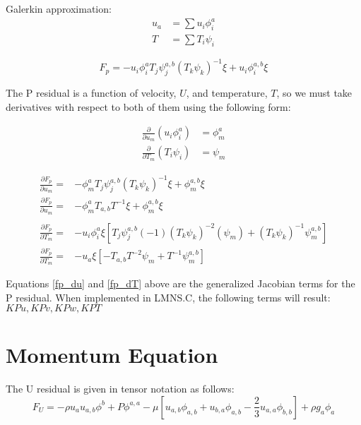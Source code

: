 Galerkin approximation:
\begin{align*}
    u_a &= \sum u_i \phi_i^a\\
    T &= \sum T_i \psi_i
\end{align*}

\begin{equation}
    F_p = -u_i \phi_i^a T_j \psi_j^{a,b} (T_k \psi_k)^{-1} \xi + u_i \phi_i^{a,b} \xi
\end{equation}

The P residual is a function of velocity, $U$, and temperature, $T$, so we must take derivatives with respect to both of them using the following form:

\begin{align*}
    \frac{\partial}{\partial u_m} (u_i \phi_i^a) &= \phi_m^a \\
    \frac{\partial}{\partial T_m} (T_i \psi_i) &= \psi_m
\end{align*}

\begin{align}
    \frac{\partial F_p}{\partial u_m} = &-\phi_m^{a} T_j \psi_j^{a,b} (T_k \psi_k)^{-1} \xi + \phi_m^{a,b} \xi \nonumber \\
    \frac{\partial F_p}{\partial u_m} = &-\phi_m^{a} T_{a,b} T^{-1} \xi + \phi_m^{a,b} \xi \label {fp_du}\\ 
    \nonumber \\
    \frac{\partial F_p}{\partial T_m} = &-u_i \phi_i^a \xi \left [ T_j \psi_j^{a,b} (-1) (T_k \psi_k)^{-2} (\psi_m) + (T_k \psi_k)^{-1} \psi_m^{a,b} \right ] \nonumber \\
    \frac{\partial F_p}{\partial T_m} = &-u_a \xi \left [ -T_{a,b} T^{-2} \psi_m + T^{-1} \psi_m^{a,b} \right ] \label{fp_dT}
\end{align}

Equations \ref{fp_du} and \ref{fp_dT} above are the generalized Jacobian terms for the P residual. When implemented in LMNS.C, the following terms will result:\\
$KPu, KPv, KPw, KPT$


\section{Momentum Equation}
The U residual is given in tensor notation as follows:
\begin{equation}
    F_U = -\rho u_a u_{a,b} \phi^b + P \phi^{a,a} - \mu \left [u_{a,b} \phi_{a,b} + u_{b,a} \phi_{a,b} - \frac{2}{3} u_{a,a} \phi_{b,b} \right ] + \rho g_a \phi_a
\end{equation}

